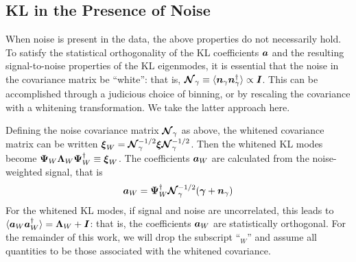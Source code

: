 \subsection{KL in the Presence of Noise}
\label{Adding_Noise}
When noise is present in the data, the above properties do not 
necessarily hold.
To satisfy the statistical orthogonality of the KL coefficients $\boldsymbol{a}$ 
and the resulting signal-to-noise properties of the KL eigenmodes, 
it is essential that the noise in the covariance matrix be ``white'': 
that is, $\boldsymbol{\mathcal{N}}_\gamma \equiv 
\langle \boldsymbol{n}_\gamma\boldsymbol{n}_\gamma^\dagger \rangle \propto \boldsymbol{I}$.  
This can be accomplished through a judicious
choice of binning, or by rescaling the covariance with a whitening 
transformation.  We take the latter approach here.

Defining the noise covariance matrix $\boldsymbol{\mathcal{N}}_\gamma$ as above,
the whitened covariance matrix can be written 
$\boldsymbol{\xi}_W = \boldsymbol{\mathcal{N}}_\gamma^{-1/2} \boldsymbol{\xi} \boldsymbol{\mathcal{N}}_\gamma^{-1/2}$.  Then 
the whitened KL modes become
$\boldsymbol{\Psi}_W\boldsymbol{\Lambda}_W\boldsymbol{\Psi}_W^\dagger \equiv \boldsymbol{\xi}_W$.
The coefficients $\boldsymbol{a}_W$ are calculated from the noise-weighted signal,
that is
\begin{equation}
  \boldsymbol{a}_W = \boldsymbol{\Psi}_W^\dagger\boldsymbol{\mathcal{N}}_\gamma^{-1/2}
  (\boldsymbol{\gamma}+\boldsymbol{n}_\gamma)
\end{equation}
For the whitened KL modes, if signal and noise are uncorrelated, this leads to 
$\langle\boldsymbol{a}_W\boldsymbol{a}_W^\dagger\rangle = \boldsymbol{\Lambda}_W + \boldsymbol{I}$:
that is, the coefficients $\boldsymbol{a}_W$ are statistically orthogonal.
For the remainder of this work, we will drop the subscript ``$_W$'' and assume
all quantities to be those associated with the whitened covariance.


